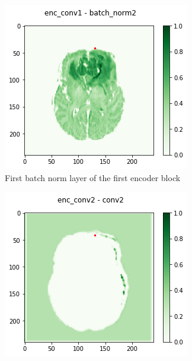 \begin{figure}[H]\ContinuedFloat
    \centering
    \begin{subfigure}{.32\textwidth}
        \centering
        \includegraphics[width=\linewidth]{chapters/04_segmentation/images/grad_cam_03.png}
        \caption{First batch norm layer of the first encoder block}
    \end{subfigure}\hfill%
    \begin{subfigure}{.32\textwidth}
        \centering
        \includegraphics[width=\linewidth]{chapters/04_segmentation/images/grad_cam_05.png}

\end{subfigure}
\end{figure}
